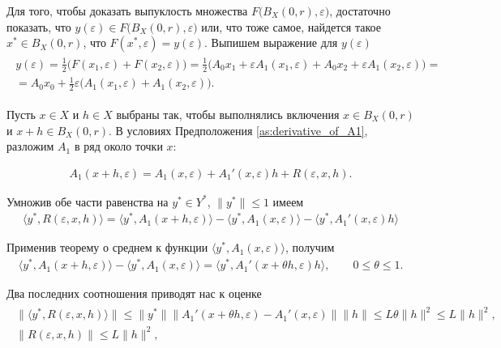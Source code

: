 \documentclass[../main.tex]{subfiles}
\begin{document}
Для того, чтобы доказать выпуклость множества $F\big(B_X(0,r),\varepsilon\big)$, достаточно показать, что $y(\varepsilon) \in F\big(B_X(0,r),\varepsilon\big)$ или, что тоже самое, найдется такое $x^* \in B_X(0,r) $, что $F(x^*, \varepsilon) = y(\varepsilon) $.
Выпишем выражение для $y(\varepsilon)$
\begin{gather}\label{y}
    \begin{gathered}
        y(\varepsilon)=
        \frac{1}{2} \big(
        F(x_1,\varepsilon)+ 
        F(x_2,\varepsilon)
        \big) = 
        \frac{1}{2} \big(
        A_0 x_1 +
        \varepsilon A_1(x_1,\varepsilon) +
        A_0 x_2 +
        \varepsilon A_1(x_2,\varepsilon) 
        \big) = \\ = A_0 x_0 + 
        \frac{1}{2} \varepsilon \big( 
        A_1(x_1,\varepsilon)+ 
        A_1(x_2,\varepsilon)
        \big).
    \end{gathered}
\end{gather}

Пусть $x \in X$ и $h \in X$ выбраны так, чтобы выполнялись включения $x\in B_X(0, r)$ и $x+h \in B_X(0, r)$.
В условиях Предположения \ref{as:derivative_of_A1}, разложим $A_1$ в ряд около точки $x$:

\begin{gather}\label{A1_series}
    A_1(x + h,\varepsilon) = A_1(x,\varepsilon) + A_1'(x,\varepsilon) h + R(\varepsilon, x, h).
\end{gather}

Умножив обе части равенства на $y^* \in Y^*$, $\|y^*\| \leqslant 1$ имеем
\begin{gather*}
    \langle y^*, R(\varepsilon, x, h) \rangle = 
    \langle y^*, A_1(x + h,\varepsilon) \rangle -
    \langle y^*, A_1(x,\varepsilon) \rangle -
    \langle y^*, A_1'(x,\varepsilon) h \rangle
\end{gather*}

Применив теорему о среднем к функции $\langle y^*, A_1(x,\varepsilon) \rangle$, получим
\begin{gather*}
    \langle y^*, A_1(x + h,\varepsilon) \rangle -
    \langle y^*, A_1(x,\varepsilon) \rangle = 
    \langle y^*, A_1'(x + \theta h,\varepsilon) h \rangle,
    \qquad
    0 \leqslant \theta \leqslant 1.
\end{gather*}

Два последних соотношения приводят нас к оценке
\begin{gather}
    \begin{gathered}
        \|\langle y^*, R(\varepsilon, x, h) \rangle \| \leqslant
        \| y^* \| 
        \| A_1'(x + \theta h,\varepsilon)  -
        A_1'(x,\varepsilon) \| 
        \| h  \| \leqslant 
        L \theta \|h\|^2 \leqslant
        L \|h\|^2, \\
        \| R(\varepsilon, x, h) \| \leqslant
        L \|h\|^2, 
    \end{gathered}
\end{gather}
\end{document}
